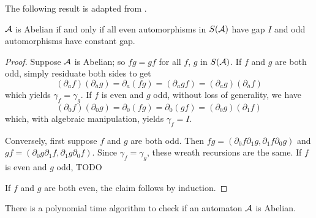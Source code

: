 \documentclass[11pt]{article}
\begin{document}
The following result is adapted from \cite{okano:thesis}.

\begin{lemma}
$\mathcal{A}$ is Abelian if and only if all even automorphisms
in $S(\mathcal{A})$ have gap $I$ and odd automorphisms have constant gap.
\end{lemma}

\begin{proof}
Suppose $\mathcal{A}$ is Abelian; so $fg = gf$ for all $f$, $g$ in $S(\mathcal{A})$.
If $f$ and $g$ are both odd, simply residuate both sides to get
\[
  (\partial_a f)(\partial_{\bar{a}}g) =
  \partial_a (fg) =
  (\partial_a gf) =
  (\partial_a g)(\partial_{\bar{a}}f)
\]
which yields $\gamma_f = \gamma_g$. If $f$ is even and $g$ odd, without loss of generality, we have
\[
  (\partial_0f)(\partial_0 g) = 
  \partial_0(fg) =
  \partial_0(gf) =
  (\partial_0g)(\partial_1 f)
\]
which, with algebraic manipulation, yields $\gamma_f = I$.

Conversely, first suppose $f$ and $g$ are both odd. Then
$fg = (\partial_0 f \partial_1 g, \partial_1 f \partial_0 g)$ and
$gf = (\partial_0 g \partial_1 f, \partial_1 g \partial_0 f)$. Since
$\gamma_f = \gamma_g$, these wreath recursions are the same. If $f$ is
even and $g$ odd, TODO

If $f$ and $g$ are both even, the claim follows by induction.
\end{proof}

\begin{theorem}
  There is a polynomial time algorithm to check if an automaton $\mathcal{A}$ is Abelian.
\end{theorem}
\end{document}
